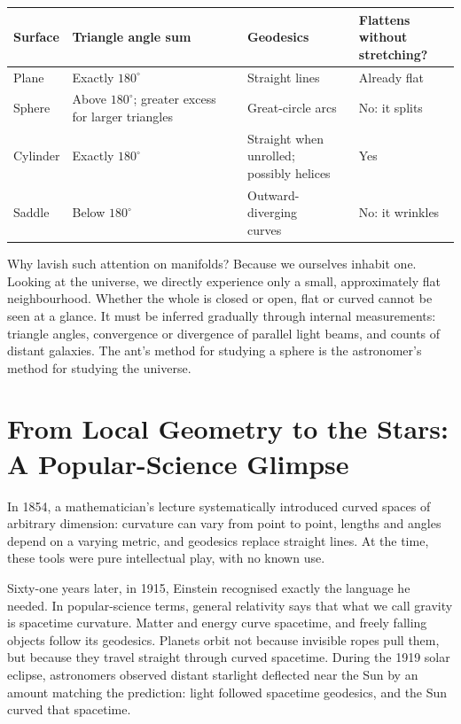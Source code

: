 \begin{table}[h]
\centering
\begin{tabular}{llll}
\toprule
Surface & Triangle angle sum & Geodesics & \shortstack[l]{Flattens without\\stretching?} \\
\midrule
Plane & Exactly $180^\circ$ & Straight lines & Already flat \\
Sphere & \shortstack[l]{Above $180^\circ$; greater excess\\for larger triangles} & Great-circle arcs & No: it splits \\
Cylinder & Exactly $180^\circ$ & \shortstack[l]{Straight when unrolled;\\possibly helices} & Yes \\
Saddle & Below $180^\circ$ & \shortstack[l]{Outward-diverging\\curves} & No: it wrinkles \\
\bottomrule
\end{tabular}
\end{table}

Why lavish such attention on manifolds? Because we ourselves inhabit one. Looking at the universe, we directly experience only a small, approximately flat neighbourhood. Whether the whole is closed or open, flat or curved cannot be seen at a glance. It must be inferred gradually through internal measurements: triangle angles, convergence or divergence of parallel light beams, and counts of distant galaxies. The ant's method for studying a sphere is the astronomer's method for studying the universe.

\section{From Local Geometry to the Stars: A Popular-Science Glimpse}

In 1854, a mathematician's lecture systematically introduced curved spaces of arbitrary dimension: curvature can vary from point to point, lengths and angles depend on a varying metric, and geodesics replace straight lines. At the time, these tools were pure intellectual play, with no known use.

Sixty-one years later, in 1915, Einstein recognised exactly the language he needed. In popular-science terms, general relativity says that what we call gravity is spacetime curvature. Matter and energy curve spacetime, and freely falling objects follow its geodesics. Planets orbit not because invisible ropes pull them, but because they travel straight through curved spacetime. During the 1919 solar eclipse, astronomers observed distant starlight deflected near the Sun by an amount matching the prediction: light followed spacetime geodesics, and the Sun curved that spacetime.

